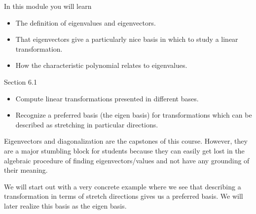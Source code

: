 \begin{module}

	In this module you will learn
	\begin{itemize}
		\item The definition of eigenvalues and eigenvectors.
		\item That eigenvectors give a particularly nice basis in which to study a linear transformation.
		\item How the characteristic polynomial relates to eigenvalues.
	\end{itemize}

	
	
\end{module}
\begin{lesson}

	Section 6.1

	\begin{itemize}
		\item Compute linear transformations presented in different bases.
		\item Recognize a preferred basis (the eigen basis) for transformations
			which can be described as stretching in particular directions.
	\end{itemize}

	Eigenvectors and diagonalization are the capstones of this course. However,
	they are a major stumbling block for students because they can easily get lost in
	the algebraic procedure of finding eigenvectors/values and not have any grounding
	of their meaning.

	We will start out with a very concrete example where we see that
	describing a transformation in terms of stretch directions gives us a preferred basis.
	We will later realize this basis as the eigen basis.

\end{lesson}
